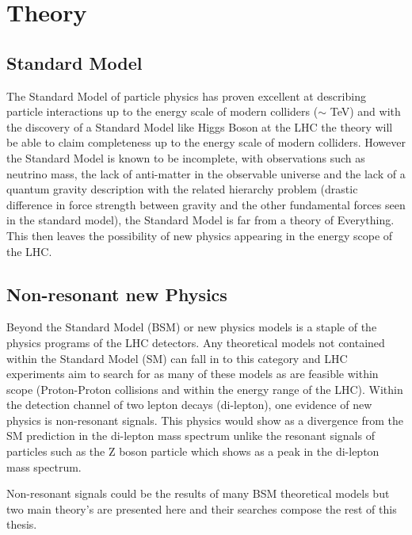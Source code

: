 \chapter{Theory}


\section{Standard Model}
    
    The Standard Model of particle physics has proven excellent at describing particle interactions up to the energy scale of modern colliders ($\sim$ TeV) and with the discovery of a Standard Model like Higgs Boson at the LHC the theory will be able to claim completeness up to the energy scale of modern colliders. However the Standard Model is known to be incomplete, with observations such as neutrino mass, the lack of anti-matter in the observable universe and the lack of a quantum gravity description with the related hierarchy problem (drastic difference in force strength between gravity and the other fundamental forces seen in the standard model),  the Standard Model is far from a theory of Everything. This then leaves the possibility of new physics appearing in the energy scope of the LHC.


\section{Non-resonant new Physics}

    Beyond the Standard Model (BSM) or new physics models is a staple of the physics programs of the LHC detectors. Any theoretical models not contained within the Standard Model (SM) can fall in to this category and LHC experiments aim to search for as many of these models as are feasible within scope (Proton-Proton collisions and within the energy range of the LHC). Within the detection channel of two lepton decays (di-lepton), one evidence of new physics is non-resonant signals. This physics would show as a divergence from the SM prediction in the di-lepton mass spectrum unlike the resonant signals of particles such as the Z boson particle which shows as a peak in the di-lepton mass spectrum.

    Non-resonant signals could be the results of many BSM theoretical models but two main theory’s are presented here and their searches compose the rest of this thesis.


